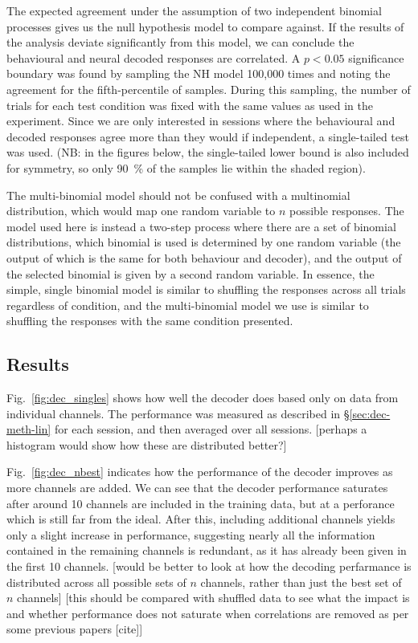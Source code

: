 The expected agreement under the assumption of two independent binomial processes gives us the null hypothesis model to compare against.
If the results of the analysis deviate significantly from this model, we can conclude the behavioural and neural decoded responses are correlated.
A $p<0.05$ significance boundary was found by sampling the NH model 100,000 times and noting the agreement for the fifth-percentile of samples.
During this sampling, the number of trials for each test condition was fixed with the same values as used in the experiment.
Since we are only interested in sessions where the behavioural and decoded responses agree more than they would if independent, a single-tailed test was used.
(NB: in the figures below, the single-tailed lower bound is also included for symmetry, so only \SI{90}{\percent} of the samples lie within the shaded region).

The multi-binomial model should not be confused with a multinomial distribution, which would map one random variable to $n$ possible responses.
The model used here is instead a two-step process where there are a set of binomial distributions, which binomial is used is determined by one random variable (the output of which is the same for both behaviour and decoder), and the output of the selected binomial is given by a second random variable.
In essence, the simple, single binomial model is similar to shuffling the responses across all trials regardless of condition, and the multi-binomial model we use is similar to shuffling the responses with the same condition presented.

\subsection{Results}

Fig.~\ref{fig:dec_singles} shows how well the decoder does based only on data from individual channels.
The performance was measured as described in \S\ref{sec:dec-meth-lin} for each session, and then averaged over all sessions.
[perhaps a histogram would show how these are distributed better?]

Fig.~\ref{fig:dec_nbest} indicates how the performance of the decoder improves as more channels are added.
We can see that the decoder performance saturates after around 10 channels are included in the training data, but at a perforance which is still far from the ideal.
After this, including additional channels yields only a slight increase in performance, suggesting nearly all the information contained in the remaining channels is redundant, as it has already been given in the first 10 channels.
[would be better to look at how the decoding perfarmance is distributed across all possible sets of $n$ channels, rather than just the best set of $n$ channels] [this should be compared with shuffled data to see what the impact is and whether performance does not saturate when correlations are removed as per some previous papers [cite]]

